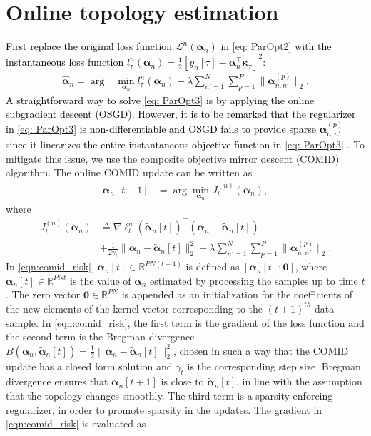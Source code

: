 \documentclass[conference]{IEEEtran}
\def\nbr#1{\left( #1\right)}
\def\bs #1{\boldsymbol{#1}}
\def\bm#1{\mathbf{#1}}
\newcommand{\cB}[1]{\textcolor{black}{#1}}
\def\p {{(p)}}
\def\n {{n'}}
\begin{document}
\section{Online topology estimation}
    \cB{First replace the original loss function $\mathcal{L}^n(\bs\alpha_n)$ in \eqref{eq: ParOpt2} with the instantaneous loss function $l_\tau^n(\bs\alpha_n)=\frac{1}{2}[y_{n}[\tau]- \bs{\alpha}_{n}^\top\bs{\kappa}_\tau]^2$:
     \begin{align} \label{eq: ParOpt3}
\widehat{\bs{\alpha}}_n=
\arg &\min_{\bs\alpha_{n}}  l_\tau^n\nbr{\bs{\alpha}_{n}}+\lambda \sum_{\n = 1}^{N} \sum_{p = 1}^{P}\| \bs{\alpha}_{n,n'}^\p \|_2.
\end{align}
A straightforward way to solve \eqref{eq: ParOpt3} is by applying the online subgradient descent (OSGD). However, it is to be remarked that the regularizer in \eqref{eq: ParOpt3} is non-differentiable and OSGD fails to provide sparse $\bs{\alpha}_{n,n'}^\p$ since it linearizes the entire instantaneous objective function in \eqref{eq: ParOpt3} \cite{onlzam2019}.} To mitigate this issue, we use the composite objective mirror descent (COMID) \cite{Comjoh2010} algorithm. The online COMID update can be written as 
    \begin{align}\label{eqn:comid_update}
    {\bs{\alpha}}_n[t+1]&=\arg \min_{{\bs{\alpha} }_n} J_t^{(n)}({\bs{\alpha}}_n),
    \end{align}
 where
    \begin{align}
    J_t^{(n)}({\bs{\alpha}}_n) &\triangleq \nabla \ell_{t}^n({\bs{\tilde{\alpha}}}_n[t])^\top\nbr{{\bs{\alpha}}_n -{\bs{\tilde{\alpha}}}_n[t]}\nonumber\\ &+\frac{1}{2\gamma_t}\| {\bs{\alpha}}_n -{\bs{\tilde{\alpha}}}_n[t]\|_2^2+\lambda \sum_{\n = 1}^{N} \sum_{p = 1}^{P}\| \bs{\alpha}_{n,n'}^\p \|_2. \label{eqn:comid_risk}
\end{align}
In \eqref{eqn:comid_risk}, ${\bs {\tilde{\alpha}}}_n[t]\in \mathbb{R}^{PN(t+1)}$ is defined as $[\bs \alpha_n[t];\bm{0}]$, where $\bs \alpha_n[t]\in \mathbb{R}^{PNt}$ is the value of $\bs \alpha_n$  estimated by processing the samples up to time $t$. The zero vector $\mathbf{0}\in \mathbb{R}^{PN}$ is appended as an initialization for the coefficients of the new elements of the kernel vector corresponding to the $(t+1)^{th}$ data sample. In \eqref{eqn:comid_risk}, the first term is the gradient of the loss function and the second term is the Bregman divergence $B({\bs{\alpha}}_n ,{\bs{\tilde{\alpha}}}_n[t])=\frac{1}{2}\| {\bs{\alpha}}_n -{\bs{\tilde{\alpha}}}_n[t]\|_2^2$, chosen in such a way that the COMID update has a closed form solution \cite{bregut2011} and $\gamma_t$ is the corresponding step size. Bregman divergence ensures that ${\bs \alpha}_n[t+1]$ is close to ${\bs{ \tilde{\alpha}}}_n[t]$, in line with the assumption that the topology changes smoothly. The third term is a sparsity enforcing regularizer, in order to promote sparsity in the updates. The gradient in \eqref{eqn:comid_risk} is evaluated as
\end{document}
